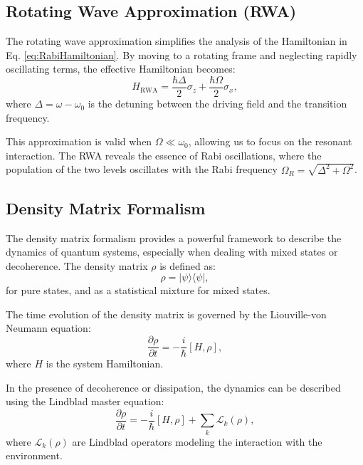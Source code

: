 
\subsection{Rotating Wave Approximation (RWA)}

The rotating wave approximation simplifies the analysis of the Hamiltonian in Eq. \eqref{eq:RabiHamiltonian}. By moving to a rotating frame and neglecting rapidly oscillating terms, the effective Hamiltonian becomes:
\begin{equation}
    H_{\text{RWA}} = \frac{\hbar \Delta}{2} \sigma_z + \frac{\hbar \Omega}{2} \sigma_x,
    \label{eq:RWAHamiltonian}
\end{equation}
where \(\Delta = \omega - \omega_0\) is the detuning between the driving field and the transition frequency.

This approximation is valid when \(\Omega \ll \omega_0\), allowing us to focus on the resonant interaction. The RWA reveals the essence of Rabi oscillations, where the population of the two levels oscillates with the Rabi frequency \(\Omega_R = \sqrt{\Delta^2 + \Omega^2}\).


\subsection{Density Matrix Formalism}

The density matrix formalism provides a powerful framework to describe the dynamics of quantum systems, especially when dealing with mixed states or decoherence. The density matrix \(\rho\) is defined as:
\begin{equation}
    \rho = |\psi\rangle \langle \psi|,
    \label{eq:DensityMatrix}
\end{equation}
for pure states, and as a statistical mixture for mixed states.

The time evolution of the density matrix is governed by the Liouville-von Neumann equation:
\begin{equation}
    \frac{\partial \rho}{\partial t} = -\frac{i}{\hbar} [H, \rho],
    \label{eq:Liouville}
\end{equation}
where \(H\) is the system Hamiltonian.

In the presence of decoherence or dissipation, the dynamics can be described using the Lindblad master equation:
\begin{equation}
    \frac{\partial \rho}{\partial t} = -\frac{i}{\hbar} [H, \rho] + \sum_k \mathcal{L}_k(\rho),
    \label{eq:Lindblad}
\end{equation}
where \(\mathcal{L}_k(\rho)\) are Lindblad operators modeling the interaction with the environment.

